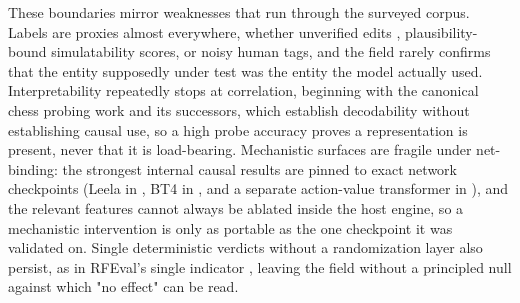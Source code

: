 \documentclass[conference]{IEEEtran}
\begin{document}
These boundaries mirror weaknesses that run through the surveyed corpus. Labels are proxies almost everywhere, whether unverified edits \cite{ref15}, plausibility-bound simulatability scores, or noisy human tags, and the field rarely confirms that the entity supposedly under test was the entity the model actually used. Interpretability repeatedly stops at correlation, beginning with the canonical chess probing work \cite{ref1} and its successors, which establish decodability without establishing causal use, so a high probe accuracy proves a representation is present, never that it is load-bearing. Mechanistic surfaces are fragile under net-binding: the strongest internal causal results are pinned to exact network checkpoints (Leela in \cite{ref4}, BT4 in \cite{ref6}, and a separate action-value transformer in \cite{ref7}), and the relevant features cannot always be ablated inside the host engine, so a mechanistic intervention is only as portable as the one checkpoint it was validated on. Single deterministic verdicts without a randomization layer also persist, as in RFEval's single indicator \cite{ref16}, leaving the field without a principled null against which "no effect" can be read.
\end{document}
